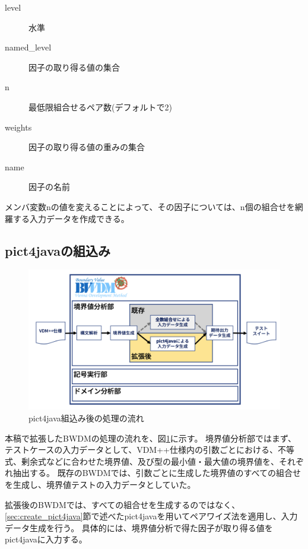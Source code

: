 \documentclass[uplatex, report, a4j, 10pt]{jsbook}
\begin{document}
\begin{itemize}
        \begin{description}
          \item[level] 水準
          \item[named\_level] 因子の取り得る値の集合
          \item[n] 最低限組合せるペア数(デフォルトで2)
          \item[weights] 因子の取り得る値の重みの集合
          \item[name] 因子の名前
        \end{description}
        メンバ変数nの値を変えることによって、その因子については、n個の組合せを網羅する入力データを作成できる。
\end{itemize}

\subsection{pict4javaの組込み}
\begin{figure}[tp]
  \centering
  \includegraphics[keepaspectratio, width=160mm]{figs/pict4java_embed}
  \caption{pict4java組込み後の処理の流れ}
  \label{fig:pict4javaEmbed}
\end{figure}

本稿で拡張したBWDMの処理の流れを、図\ref{fig:pict4javaEmbed}に示す。
境界値分析部ではまず、テストケースの入力データとして、VDM++仕様内の引数ごとにおける、不等式、剰余式などに合わせた境界値、及び型の最小値・最大値の境界値を、それぞれ抽出する。
既存のBWDMでは、引数ごとに生成した境界値のすべての組合せを生成し、境界値テストの入力データとしていた。

拡張後のBWDMでは、すべての組合せを生成するのではなく、\ref{sec:create_pict4java}節で述べたpict4javaを用いてペアワイズ法を適用し、入力データ生成を行う。
具体的には、境界値分析で得た因子が取り得る値をpict4javaに入力する。
\end{document}
